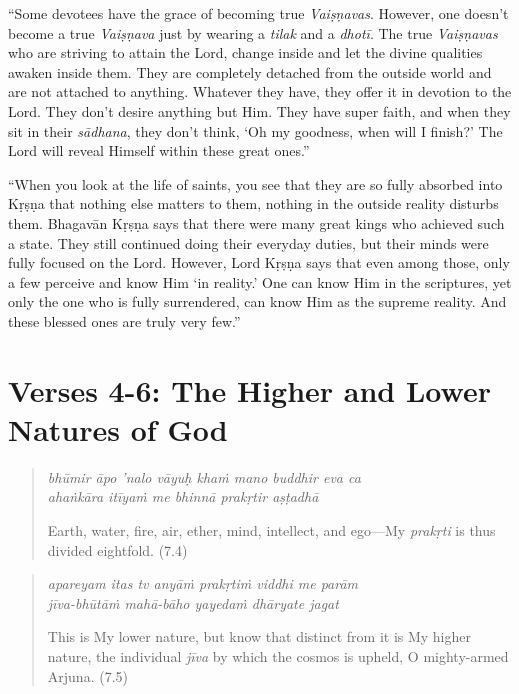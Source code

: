 \documentclass[12pt, twoside, openright]{memoir}
\begin{document}
\enquote{Some devotees have the grace of becoming true \textit{Vaiṣṇavas}. However, one doesn’t become a true \textit{Vaiṣṇava} just by wearing a \textit{tilak} and a \textit{dhotī}. The true \textit{Vaiṣṇavas} who are striving to attain the Lord, change inside and let the divine qualities awaken inside them. They are completely detached from the outside world and are not attached to anything. Whatever they have, they offer it in devotion to the Lord. They don’t desire anything but Him. They have super faith, and when they sit in their \textit{sādhana}, they don’t think, \enquote{Oh my goodness, when will I finish?} The Lord will reveal Himself within these great ones.}

\enquote{When you look at the life of saints, you see that they are so fully absorbed into Kṛṣṇa that nothing else matters to them, nothing in the outside reality disturbs them. Bhagavān Kṛṣṇa says that there were many great kings who achieved such a state. They still continued doing their everyday duties, but their minds were fully focused on the Lord. However, Lord Kṛṣṇa says that even among those, only a few perceive and know Him \enquote{in reality.} One can know Him in the scriptures, yet only the one who is fully surrendered, can know Him as the supreme reality. And these blessed ones are truly very few.}

\section{Verses 4-6: The Higher and Lower Natures of God}\label{sec-verses-4-11-the-higher-and-lower-natures-of-god}

\par
\begin{verse}
\textit{bhūmir āpo ’nalo vāyuḥ khaṁ mano buddhir eva ca} \\
\textit{ahaṅkāra itīyaṁ me bhinnā prakṛtir aṣṭadhā}

\noindent Earth, water, fire, air, ether, mind, intellect, and ego---My \textit{prakṛti} is thus divided eightfold. (7.4)
\end{verse}
\par



\par
\begin{verse}
\textit{apareyam itas tv anyāṁ prakṛtiṁ viddhi me parām} \\
\textit{jīva-bhūtāṁ mahā-bāho yayedaṁ dhāryate jagat}

\noindent This is My lower nature, but know that distinct from it is My higher nature, the individual \textit{jīva} by which the cosmos is upheld, O mighty-armed Arjuna. (7.5)
\end{verse}
\par
\end{document}
